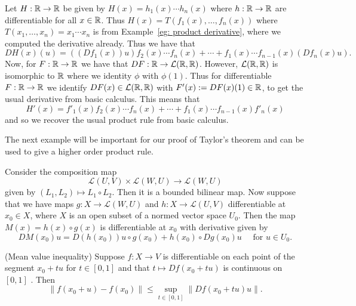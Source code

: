\documentclass[twoside, a4paper, 10pt]{amsart}
\begin{document}
\begin{eg} Let $H:\mathbb{R} \to \mathbb{R}$ be given by $H(x) = h_1(x) \cdots h_n(x)$ where $h:\mathbb{R} \to \mathbb{R}$ are differentiable for all $x \in \mathbb{R}$. Thus $H(x) = T(f_1(x), \ldots, f_n(x))$ where $T(x_1, \ldots, x_n) = x_1 \cdots x_n$ is from Example~\ref{eg: product derivative}, where we computed the derivative already. Thus we have that $$DH(x)(u) = ((Df_1(x))u)f_2(x) \cdots f_n(x) + \cdots + f_1(x) \cdots f_{n-1}(x) (Df_n(x) u).$$ Now, for $F: \mathbb{R} \to \mathbb{R}$ we have that $DF:\mathbb{R} \to \mathcal{L}(\mathbb{R}, \mathbb{R})$. However,  $\mathcal{L}(\mathbb{R}, \mathbb{R})$ is isomorphic to $\mathbb{R}$ where we identity $\phi$ with $\phi(1)$. Thus for differentiable $F:\mathbb{R} \to \mathbb{R}$ we identify $DF(x) \in \mathcal{L}(\mathbb{R}, \mathbb{R})$ with $F'(x) := DF(x)(1) \in \mathbb{R}$, to get the usual derivative from basic calculus. This means that 
$$H'(x) = f'_1(x)f_2(x) \cdots f_n(x) + \cdots + f_1(x) \cdots f_{n-1}(x) f'_n(x)$$
and so we recover the usual product rule from basic calculus.
\end{eg}

The next example will be important for our proof of Taylor's theorem and can be used to give a higher order product rule.
\begin{eg} \label{product rule for compositions} Consider the composition map $$ \mathcal{L}(U,V) \times \mathcal{L}(W, U)  \to \mathcal{L}(W,U)$$ given by $(L_1, L_2) \mapsto L_1 \circ L_2$. Then it is a bounded bilinear map. Now suppose that we have maps $g: X \to \mathcal{L}(W,U)$ and $h: X \to \mathcal{L}(U,V)$ differentiable at $x_0 \in X$, where $X$ is an open subset of a normed vector space $U_0$. Then the map $M(x) = h(x) \circ g(x)$ is differentiable at $x_0$ with derivative given by $$ DM(x_0)u = D(h(x_0))u \circ g(x_0) + h(x_0) \circ Dg(x_0)u \quad \text{ for } u \in U_0. $$ \end{eg}

\begin{lemma}(Mean value inequality) Suppose $f:X \to V$ is differentiable on each point of the segment $x_0 + tu$ for $t \in [0,1]$ and that $t \mapsto Df(x_0 + tu)$ is continuous on $[0,1]$ . Then $$\| f(x_0 + u) - f(x_0) \| \leq \sup_{t \in [0,1]} \| Df(x_0 + tu) u \|.$$ \end{lemma}
\end{document}
